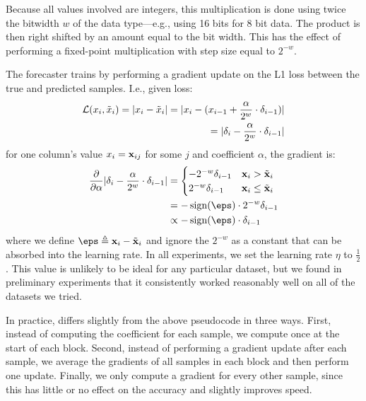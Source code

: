 Because all values involved are integers, this multiplication is done using twice the bitwidth $w$ of the data type---e.g., using 16 bits for 8 bit data. The product is then right shifted by an amount equal to the bit width. This has the effect of performing a fixed-point multiplication with step size equal to $2^{-w}$.

The forecaster trains by performing a gradient update on the L1 loss between the true and predicted samples. I.e., given loss:
\begin{align}
    \mathcal{L}(x_i, \tilde{x}_{i}) = \lvert x_i - \tilde{x}_i\rvert
    = \lvert x_i - (x_{i-1} + \frac{\alpha}{2^w} \cdot \delta_{i-1})\rvert \\
    = \lvert\delta_{i} - \frac{\alpha}{2^w} \cdot \delta_{i-1}\rvert
\end{align}
for one column's value $x_i = \mathbf{x}_{ij}$ for some $j$ and coefficient $\alpha$, the gradient is:
\begin{align}
        \frac{\partial }{\partial \alpha} \abs{\delta_{i} - \frac{\alpha}{2^w} \cdot \delta_{i-1}}
&= \begin{cases}
        -{2^{-w}}\vdelta_{i-1} & \x_{i} > \tilde{\x}_{i} \\
        {2^{-w}}\vdelta_{i-1} & \x_{i} \le \tilde{\x}_{i}
\end{cases} \\
&= -\sign(\eps) \cdot {2^{-w}}\vdelta_{i-1} \\
&\propto -\sign(\eps) \cdot \vdelta_{i-1}
\end{align}
where we define $\eps \triangleq \x_{i} - \tilde{\x}_{i}$ and ignore the $2^{-w}$ as a constant that can be absorbed into the learning rate. In all experiments, we set the learning rate $\eta$ to $\frac{1}{2}$. This value is unlikely to be ideal for any particular dataset, but we found in preliminary experiments that it consistently worked reasonably well on all of the datasets we tried. %

In practice, \fire differs slightly from the above pseudocode in three ways. First, instead of computing the coefficient for each sample, we compute once at the start of each block. Second, instead of performing a gradient update after each sample, we average the gradients of all samples in each block and then perform one update. Finally, we only compute a gradient for every other sample, since this has little or no effect on the accuracy and slightly improves speed.

